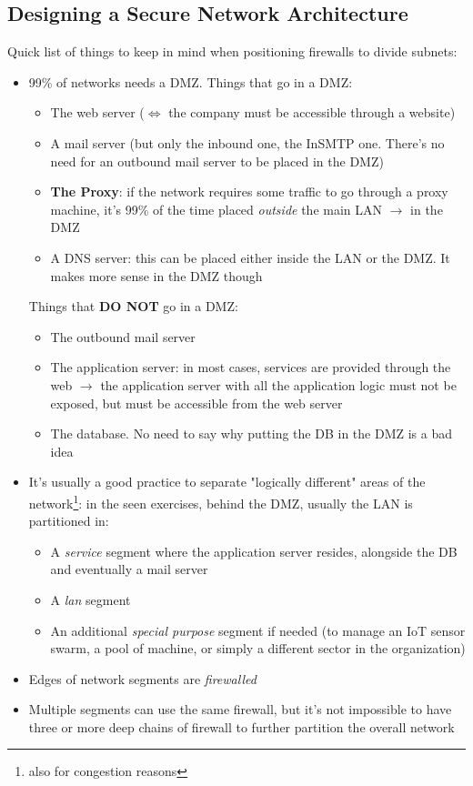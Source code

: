 \documentclass{article}
\begin{document}
			\subsection{Designing a Secure Network Architecture}
				Quick list of things to keep in mind when positioning firewalls to divide subnets:
				\begin{itemize}
					\item 99\% of networks needs a DMZ. Things that go in a DMZ:
						\begin{itemize}
							\item The web server ($\Leftrightarrow$ the company must be accessible through a website)
							\item A mail server (but only the inbound one, the InSMTP one. There's no need for an outbound mail server to be placed in the DMZ)
							\item \textbf{The Proxy}: if the network requires some traffic to go through a proxy machine, it's 99\% of the time placed \textit{outside} the main LAN $\rightarrow$ in the DMZ
							\item A DNS server: this can be placed either inside the LAN or the DMZ. It makes more sense in the DMZ though
						\end{itemize}
						Things that \textbf{DO NOT} go in a DMZ:
						\begin{itemize}
							\item The outbound mail server 
							\item The application server: in most cases, services are provided through the web $\rightarrow$ the application server with all the application logic must not be exposed, but must be accessible from the web server
							\item The database. No need to say why putting the DB in the DMZ is a bad idea
						\end{itemize}
					\item It's usually a good practice to separate "logically different" areas of the network\footnote{also for congestion reasons}: in the seen exercises, behind the DMZ, usually the LAN is partitioned in:
						\begin{itemize}
							\item A \textit{service} segment where the application server resides, alongside the DB and eventually a mail server
							\item A \textit{lan} segment
							\item An additional \textit{special purpose} segment if needed (to manage an IoT sensor swarm, a pool of machine, or simply a different sector in the organization)
						\end{itemize}
					\item Edges of network segments are \textit{firewalled}
					\item Multiple segments can use the same firewall, but it's not impossible to have three or more deep chains of firewall to further partition the overall network
				\end{itemize}
\end{document}
